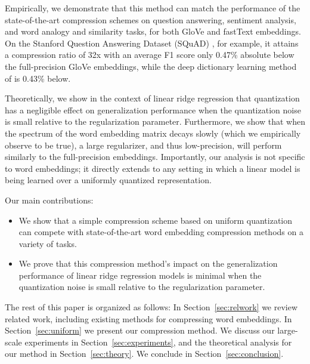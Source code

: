 Empirically, we demonstrate that this method can match the performance of the state-of-the-art compression schemes on question answering, sentiment analysis, and word analogy and similarity tasks, for both GloVe \citep{glove14} and fastText \citep{fasttext18} embeddings.
On the Stanford Question Answering Dataset (SQuAD) \citep{squad16}, for example, it attains a compression ratio of 32x with an average F1 score only 0.47\% absolute below the full-precision GloVe embeddings, while the deep dictionary learning method of \citet{dccl17} is 0.43\% below.

Theoretically, we show in the context of linear ridge regression that quantization has a negligible effect on generalization performance when the quantization noise is small relative to the regularization parameter.
Furthermore, we show that when the spectrum of the word embedding matrix decays slowly (which we empirically observe to be true), a large regularizer, and thus low-precision, will perform similarly to the full-precision embeddings.
Importantly, our analysis is not specific to word embeddings; it directly extends to any setting in which a linear model is being learned over a uniformly quantized representation.

Our main contributions:
\begin{itemize}
	\item We show that a simple compression scheme based on uniform quantization can compete with state-of-the-art word embedding compression methods on a variety of tasks.
	\item We prove that this compression method's impact on the generalization performance of linear ridge regression models is minimal when the quantization noise is small relative to the regularization parameter.
\end{itemize}

The rest of this paper is organized as follows:
In Section~\ref{sec:relwork} we review related work, including existing methods for compressing word embeddings.
In Section~\ref{sec:uniform} we present our compression method.
We discuss our large-scale experiments in Section~\ref{sec:experiments}, and the theoretical analysis for our method in Section~\ref{sec:theory}.
We conclude in Section~\ref{sec:conclusion}.
